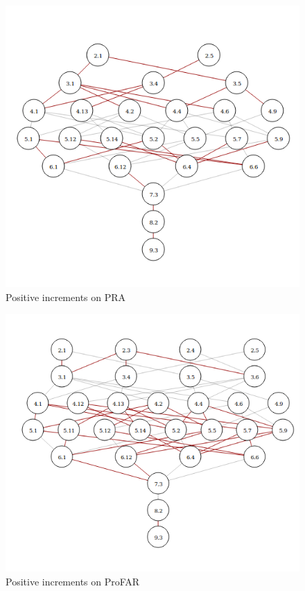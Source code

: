 \documentclass[12pt,twoside]{reedthesis}
\begin{document}
  \begin{figure}[h!tbp]
  \centering
  \includegraphics[angle = 0,scale = 0.6]{conclusion/SolocirculosPRA.png}
  \caption[Positive increments on PRA]{\normalsize{Positive increments on PRA}}
  \label{fig:PRARutas}
  \end{figure}
  
  \begin{figure}[h!tbp]
  \centering
  \includegraphics[angle = 0,scale = 0.6]{conclusion/SolocirculosPRO.png}
  \caption[Positive increments on ProFAR]{\normalsize{Positive increments on ProFAR}}
  \label{fig:ProFARRutas}
  \end{figure}
  
\end{document}

